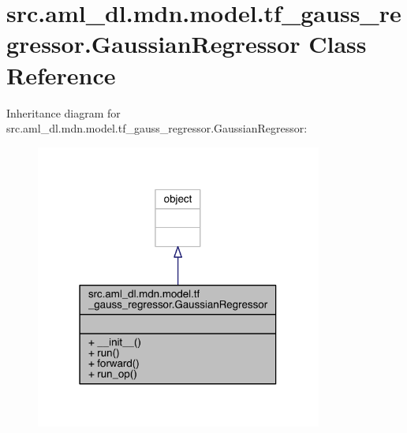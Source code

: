 \hypertarget{classsrc_1_1aml__dl_1_1mdn_1_1model_1_1tf__gauss__regressor_1_1_gaussian_regressor}{}\section{src.\+aml\+\_\+dl.\+mdn.\+model.\+tf\+\_\+gauss\+\_\+regressor.\+Gaussian\+Regressor Class Reference}
\label{classsrc_1_1aml__dl_1_1mdn_1_1model_1_1tf__gauss__regressor_1_1_gaussian_regressor}


Inheritance diagram for src.\+aml\+\_\+dl.\+mdn.\+model.\+tf\+\_\+gauss\+\_\+regressor.\+Gaussian\+Regressor\+:
\nopagebreak
\begin{figure}[H]
\begin{center}
\leavevmode
\includegraphics[width=267pt]{classsrc_1_1aml__dl_1_1mdn_1_1model_1_1tf__gauss__regressor_1_1_gaussian_regressor__inherit__graph}
\end{center}
\end{figure}



